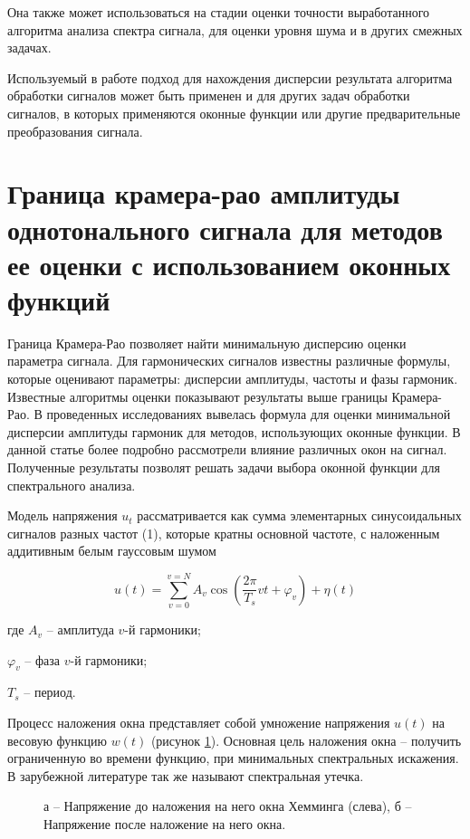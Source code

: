 Она также может использоваться на стадии оценки точности выработанного алгоритма анализа спектра сигнала, для оценки уровня шума и в других смежных задачах.

Используемый в работе подход для нахождения дисперсии результата алгоритма обработки сигналов может быть применен и для других задач обработки сигналов, в которых применяются оконные функции или другие предварительные преобразования сигнала.

\section{Граница крамера-рао амплитуды однотонального сигнала для методов ее оценки с использованием оконных функций} \label{sec:ch2/sec6} %

Граница Крамера-Рао позволяет найти минимальную дисперсию оценки параметра сигнала. Для гармонических сигналов известны различные формулы, которые оценивают параметры: дисперсии амплитуды, частоты и фазы гармоник. Известные алгоритмы оценки показывают результаты выше границы Крамера-Рао. В проведенных исследованиях \cite{altman2020boundary} вывелась формула для оценки минимальной дисперсии амплитуды гармоник для методов, использующих оконные функции. В данной статье более подробно рассмотрели влияние различных окон на сигнал. Полученные результаты позволят решать задачи выбора оконной функции для спектрального анализа.

Модель напряжения $u_{t}$ рассматривается как сумма элементарных синусоидальных сигналов разных частот (1), которые кратны основной частоте, с наложенным аддитивным белым гауссовым шумом 

\begin{equation}
	\label{eq:equation13}
	u(t)=\sum_{v=0}^{v=N}A_{v}\cos \left( \frac{2 \pi}{T_{s}}vt + \varphi_{v} \right) + \eta(t)
\end{equation}

где $A_{v}$ -- амплитуда $v$-й гармоники;

$\varphi_{v}$ -- фаза $v$-й гармоники;

$T_{s}$ -- период.

Процесс наложения окна представляет собой умножение напряжения $u(t)$ на весовую функцию $w(t)$ (рисунок \ref{img:blending_process _and_Hamming_window}). Основная цель наложения окна -- получить ограниченную во времени функцию, при минимальных спектральных искажения. В зарубежной литературе так же называют спектральная утечка.
\begin{figure}[ht]
	\caption{а – Напряжение до наложения на него окна Хемминга (слева), б – Напряжение после наложение на него окна.}\label{img:blending_process _and_Hamming_window}
\end{figure}

